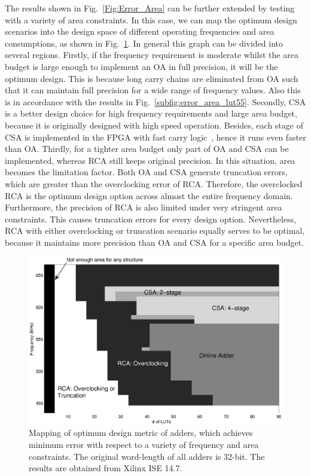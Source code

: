 \documentclass[10pt, conference, compsocconf]{IEEEtran}
\begin{document}
The results shown in Fig.~\ref{Fig:Error_Area} can be further extended by testing with a variety of area constraints. In this case, we can map the optimum design scenarios into the design space of different operating frequencies and area consumptions, as shown in Fig.~\ref{Fig:adder_3d_FreqArea}. In general this graph can be divided into several regions. Firstly, if the frequency requirement is moderate whilst the area budget is large enough to implement an OA in full precision, it will be the optimum design. This is because long carry chains are eliminated from OA such that it can maintain full precision for a wide range of frequency values. Also this is in accordance with the results in Fig.~\ref{subfig:error_area_lut55}. Secondly, CSA is a better design choice for high frequency requirements and large area budget, because it is originally designed with high speed operation. Besides, each stage of CSA is implemented in the FPGA with fast carry logic~\cite{Virtex6}, hence it runs even faster than OA. Thirdly, for a tighter area budget only part of OA and CSA can be implemented, whereas RCA still keeps original precision. In this situation, area becomes the limitation factor. Both OA and CSA generate truncation errors, which are greater than the overclocking error of RCA. Therefore, the overclocked RCA is the optimum design option across almost the entire frequency domain. Furthermore, the precision of RCA is also limited under very stringent area constraints. This causes truncation errors for every design option. Nevertheless, RCA with either overclocking or truncation scenario equally serves to be optimal, because it maintains more precision than OA and CSA for a specific area budget.

\begin{figure}[tbp]
  \centering
  \includegraphics[width=.7\textwidth]{./figures/exp/3d_FreqArea.eps}
  \vspace{-3ex}
  \caption{Mapping of optimum design metric of adders, which achieves minimum error with respect to a variety of frequency and area constraints. The original word-length of all adders is 32-bit. The results are obtained from Xilinx ISE 14.7.}
  \label{Fig:adder_3d_FreqArea}
\end{figure}
\end{document}
